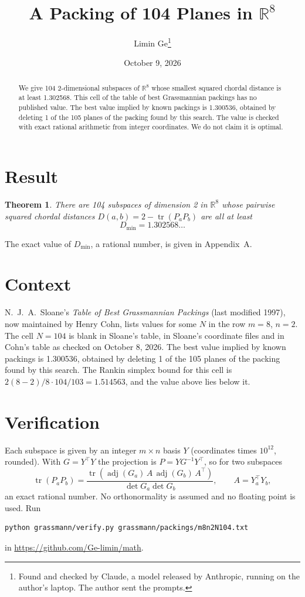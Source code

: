 \documentclass[11pt,a4paper]{article}
\title{A Packing of 104 Planes in $\mathbb{R}^{8}$}
\author{Limin Ge\thanks{Found and checked by Claude, a model released by Anthropic, running on the author's laptop. The author sent the prompts.}}
\date{October 9, 2026}
\newtheorem*{theorem}{Theorem}
\begin{document}
\maketitle
\begin{abstract}
We give 104 2-dimensional subspaces of $\mathbb{R}^{8}$ whose smallest squared chordal distance is at least 1.302568. This cell of the table of best Grassmannian packings has no published value. The best value implied by known packings is 1.300536, obtained by deleting 1 of the 105 planes of the packing found by this search. The value is checked with exact rational arithmetic from integer coordinates. We do not claim it is optimal.
\end{abstract}

\section{Result}
\begin{theorem}
There are 104 subspaces of dimension 2 in $\mathbb{R}^{8}$ whose pairwise squared chordal distances $D(a,b) = 2 - \operatorname{tr}(P_aP_b)$ are all at least
\[ D_{\min} = 1.302568\ldots \]
\end{theorem}
The exact value of $D_{\min}$, a rational number, is given in Appendix~A.


\section{Context}
N.~J.~A.~Sloane's \emph{Table of Best Grassmannian Packings} (last modified 1997), now maintained by Henry Cohn, lists values for some $N$ in the row $m=8$, $n=2$. The cell $N=104$ is blank in Sloane's table, in Sloane's coordinate files and in Cohn's table as checked on October 8, 2026. The best value implied by known packings is 1.300536, obtained by deleting 1 of the 105 planes of the packing found by this search. The Rankin simplex bound for this cell is $2(8-2)/8\cdot 104/103 = 1.514563$, and the value above lies below it.


\section{Verification}
Each subspace is given by an integer $m\times n$ basis $Y$ (coordinates times $10^{12}$, rounded). With $G=Y^\top Y$ the projection is $P=YG^{-1}Y^\top$, so for two subspaces
\[ \operatorname{tr}(P_aP_b)=\frac{\operatorname{tr}(\operatorname{adj}(G_a)\,A\,\operatorname{adj}(G_b)\,A^\top)}{\det G_a\det G_b},\qquad A=Y_a^\top Y_b, \]
an exact rational number. No orthonormality is assumed and no floating point is used. Run
\begin{verbatim}
python grassmann/verify.py grassmann/packings/m8n2N104.txt
\end{verbatim}
in \url{https://github.com/Ge-limin/math}.
\end{document}
